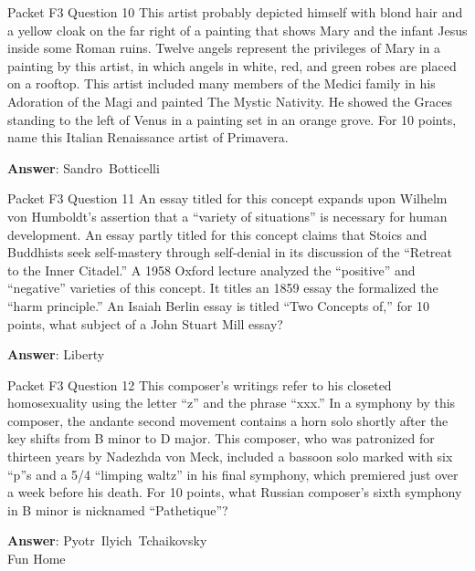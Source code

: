 \begin{frame}{Packet F3 Question 10}
This artist probably depicted himself with blond hair and a yellow cloak on the far right of a painting that shows Mary and the infant Jesus inside some Roman ruins. Twelve angels represent the privileges of Mary in a painting by this artist, in which angels in white, red, and green robes are placed on a rooftop. This artist included many members of the Medici family in his Adoration of the Magi and   painted The Mystic Nativity. He showed     the Graces standing to the left of Venus in a painting set in an orange grove. For   10 points, name this Italian Renaissance artist of Primavera.

\textbf{Answer}: Sandro\ Botticelli\\
\end{frame}

\begin{frame}{Packet F3 Question 11}
An essay titled for this concept expands upon Wilhelm von Humboldt’s assertion that a “variety of situations” is necessary for human development. An essay partly titled for this concept claims that Stoics and Buddhists seek self-mastery through     self-denial in its discussion of the “Retreat to the Inner Citadel.” A 1958 Oxford lecture analyzed the “positive” and “negative” varieties of this concept. It titles an 1859 essay the formalized the “harm principle.”     An Isaiah Berlin essay is titled “Two Concepts of,” for 10 points, what subject of a John Stuart Mill essay?

\textbf{Answer}: Liberty\\
\end{frame}

\begin{frame}{Packet F3 Question 12}
This composer’s writings refer to his closeted homosexuality using   the letter “z” and the phrase “xxx.” In a symphony by this composer, the andante second movement contains a horn solo shortly after the key shifts from B minor to D major. This composer, who was patronized for thirteen years by Nadezhda von Meck, included a bassoon solo marked   with six “p”s and a 5/4 “limping waltz” in his final symphony,   which premiered just over a week before   his death. For 10 points, what Russian composer’s sixth symphony in B minor is nicknamed “Pathetique”?

\textbf{Answer}: Pyotr\ Ilyich\ Tchaikovsky\\
 Fun Home
\end{frame}

